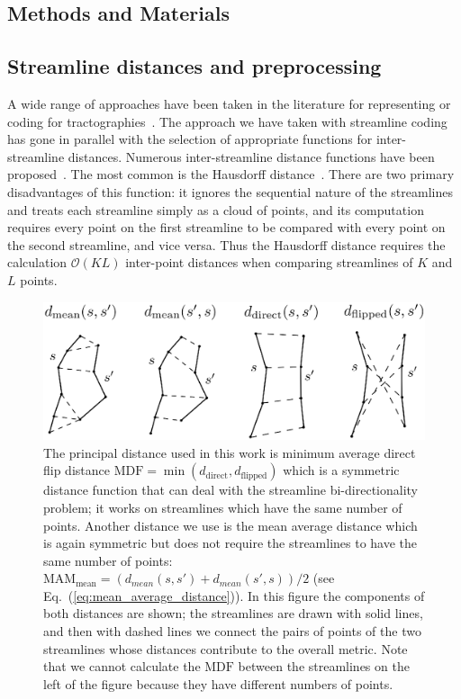 \documentclass{bioinfo}
\begin{document}
\begin{methods}

\section{Methods and Materials}

\subsection{\label{sub:track-distances}Streamline distances and
  preprocessing}

A wide range of approaches have been taken in the literature for
representing or coding for tractographies~\citep{Guevara2010,
  chung2010cosine}. The approach we have taken with streamline coding
has gone in parallel with the selection of appropriate functions for
inter-streamline distances.  Numerous inter-streamline distance
functions have been proposed~\citep{Ding2003, MaddahIPMI2007,
  zhang2005dti}. The most common is the Hausdorff distance~\citep[and
many other studies]{corouge2004towards}. There are two primary
disadvantages of this function: it ignores the sequential nature of the
streamlines and treats each streamline simply as a cloud of points, and
its computation requires every point on the first streamline to be
compared with every point on the second streamline, and vice versa. Thus
the Hausdorff distance requires the calculation $\mathcal{O}(KL)$
inter-point distances when comparing streamlines of $K$ and $L$ points.

\begin{figure}
\includegraphics[scale=0.4]{Figures/Fig_2_distances2}
\centering{}
\caption{The principal distance used in this work is minimum average
  direct flip distance
  $\textrm{MDF}=\min(d_{\textrm{direct}},d_{\textrm{flipped}})$ which is
  a symmetric distance function that can deal with the streamline
  bi-directionality problem; it works on streamlines which have the same
  number of points.  Another distance we use is the mean average
  distance which is again symmetric but does not require the streamlines
  to have the same number of points: $\textrm{MAM}_{\textrm{mean}} =
  (d_{mean}(s, s') + d_{mean}(s',s))/2$ (see Eq.~(\ref{eq:mean_average_distance})). 
  In this figure the components of both distances are shown; the streamlines are
  drawn with solid lines, and then with dashed lines we connect the
  pairs of points of the two streamlines whose distances contribute to
  the overall metric. Note that we cannot calculate the $\textrm{MDF}$
  between the streamlines on the left of the figure because they have
  different numbers of points.
  \label{Flo:Distances_used}}
\end{figure}


\end{methods}
\end{document}

